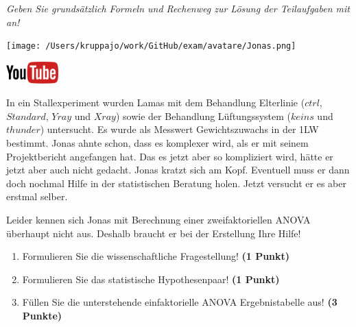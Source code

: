 \documentclass[a4paper, 9pt]{scrartcl}\usepackage[]{graphicx}\usepackage[]{xcolor}
\begin{document}
\textit{Geben Sie grundsätzlich Formeln und Rechenweg zur Lösung der Teilaufgaben mit an!} \\[1Ex]
 

 
\begin{minipage}[t]{0.5\textwidth}
\texttt{[image: /Users/kruppajo/work/GitHub/exam/avatare/Jonas.png]}
\end{minipage}
\begin{minipage}[t]{0.5\textwidth}
\hfill
\href{https://youtu.be/8Pb2sKUIMyk}{\includegraphics[width = 2cm]{img/youtube}}\\[1Ex]
\end{minipage}
\vspace{1ex}



In ein Stallexperiment wurden Lamas mit dem Behandlung Elterlinie ($ctrl$, $Standard$, $Yray$ und $Xray$) sowie der Behandlung Lüftungssystem ($keins$ und $thunder$) untersucht. Es wurde als Messwert Gewichtszuwachs in der 1LW bestimmt. Jonas ahnte schon, dass es komplexer wird, als er mit seinem Projektbericht angefangen hat. Das es jetzt aber so kompliziert wird, hätte er jetzt aber auch nicht gedacht. Jonas kratzt sich am Kopf. Eventuell muss er dann doch nochmal Hilfe in der statistischen Beratung holen. Jetzt versucht er es aber erstmal selber.



\vspace{1ex}

Leider kennen sich Jonas mit Berechnung einer zweifaktoriellen ANOVA überhaupt nicht aus. Deshalb braucht er bei der Erstellung Ihre Hilfe! 

\begin{enumerate}
  \item Formulieren Sie die wissenschaftliche Fragestellung! \textbf{(1 Punkt)}
  \item Formulieren Sie das statistische Hypothesenpaar! \textbf{(1 Punkt)}
\item Füllen Sie die unterstehende einfaktorielle ANOVA Ergebnistabelle aus! \textbf{(3 Punkte)}
\end{enumerate}

\vspace{1Ex}
\end{document}
